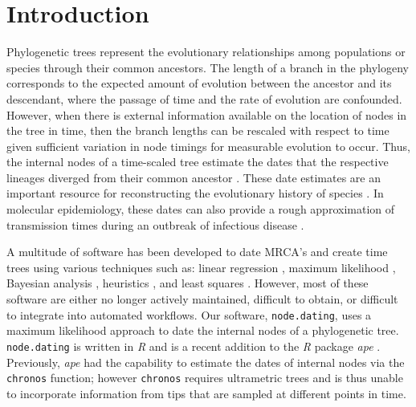 \documentclass{bioinfo}
\newcommand{\code}[1]{{\tt #1}}
\begin{document}
\section{Introduction} \label{sec:intro}
Phylogenetic trees represent the evolutionary relationships among populations or species through their common ancestors.  
The length of a branch in the phylogeny corresponds to the expected amount of evolution between the ancestor and its descendant, where the passage of time and the rate of evolution are confounded.
However, when there is external information available on the location of nodes in the tree in time, then the branch lengths can be rescaled with respect to time given sufficient variation in node timings for measurable evolution to occur.
Thus, the internal nodes of a time-scaled tree estimate the dates that the respective lineages diverged from their common ancestor \citep{Kumar16}.
These date estimates are an important resource for reconstructing the evolutionary history of species \citep{Shapiro04}.
In molecular epidemiology, these dates can also provide a rough approximation of transmission times during an outbreak of infectious disease \citep{Ypma13}.

A multitude of software has been developed to date MRCA's and create time trees using various techniques such as: linear regression \citep{Tempest}, maximum likelihood \citep{TipDates, r8ts, PAML}, Bayesian analysis \citep{BEAST}, heuristics \citep{UPGMA, TREBLE}, and least squares \citep{LSD}.
However, most of these software are either no longer actively maintained, difficult to obtain, or difficult to integrate into automated workflows.
Our software, \code{node.dating}, uses a maximum likelihood approach to date the internal nodes of a phylogenetic tree.
\code{node.dating} is written in \emph{R} and is a recent addition to the \emph{R} package \emph{ape} \citep{APE}.
Previously, \emph{ape} had the capability to estimate the dates of internal nodes via the \code{chronos} function; however \code{chronos} requires ultrametric trees and is thus unable to incorporate information from tips that are sampled at different points in time.
\end{document}
